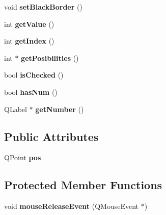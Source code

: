 \begin{DoxyCompactItemize}
\item 
\hypertarget{class_celda_ac56176d091cbca011a1d93530f179800}{void {\bfseries set\-Black\-Border} ()}\label{class_celda_ac56176d091cbca011a1d93530f179800}

\item 
\hypertarget{class_celda_aa37c81071e8d384b46661d30e30d9e3e}{int {\bfseries get\-Value} ()}\label{class_celda_aa37c81071e8d384b46661d30e30d9e3e}

\item 
\hypertarget{class_celda_a7e16d4f745601f63ac8e5178bc0f4e54}{int {\bfseries get\-Index} ()}\label{class_celda_a7e16d4f745601f63ac8e5178bc0f4e54}

\item 
\hypertarget{class_celda_a1018c36394dd882c632a71c7fb12999a}{int $\ast$ {\bfseries get\-Posibilities} ()}\label{class_celda_a1018c36394dd882c632a71c7fb12999a}

\item 
\hypertarget{class_celda_a592dd2bcba1d493d884c90b47fdadf00}{bool {\bfseries is\-Checked} ()}\label{class_celda_a592dd2bcba1d493d884c90b47fdadf00}

\item 
\hypertarget{class_celda_ab6966d037ddd5e0c1bb99aca39647379}{bool {\bfseries has\-Num} ()}\label{class_celda_ab6966d037ddd5e0c1bb99aca39647379}

\item 
\hypertarget{class_celda_a9de72cff68e6b39fb062b4a3d386f627}{Q\-Label $\ast$ {\bfseries get\-Number} ()}\label{class_celda_a9de72cff68e6b39fb062b4a3d386f627}

\end{DoxyCompactItemize}
\subsection*{Public Attributes}
\begin{DoxyCompactItemize}
\item 
\hypertarget{class_celda_ae7a0ff06a1409fc11aee254999108598}{Q\-Point {\bfseries pos}}\label{class_celda_ae7a0ff06a1409fc11aee254999108598}

\end{DoxyCompactItemize}
\subsection*{Protected Member Functions}
\begin{DoxyCompactItemize}
\item 
\hypertarget{class_celda_ae51d95d1ac700fcbb35e45ebea8be779}{void {\bfseries mouse\-Release\-Event} (Q\-Mouse\-Event $\ast$)}\label{class_celda_ae51d95d1ac700fcbb35e45ebea8be779}

\end{DoxyCompactItemize}


